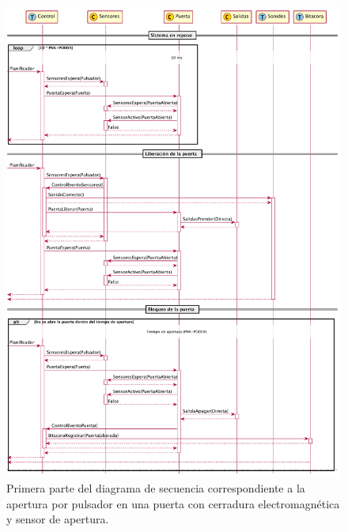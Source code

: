 \begin{figure}[ht]
	\centering
	\includegraphics[width=\textwidth]{Figures/PNK-DS002-A.pdf}
	\caption[Liberación por pulsador con cerradura electromagnética y sensor]{Primera parte del diagrama de secuencia correspondiente a la apertura por pulsador en una puerta con cerradura electromagnética y sensor de apertura.}
	\label{fig:LiberacionPulsador}
\end{figure}

